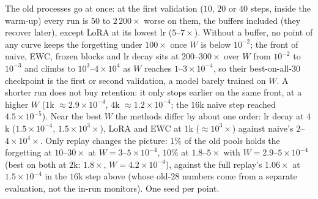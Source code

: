 \documentclass[11pt]{article}
\begin{document}
The old processes go at once: at the first validation ($10$, $20$ or $40$ steps, inside the warm-up) every run is $50$ to
$2\,200\times$ worse on them, the buffers included (they recover later), except LoRA at its lowest lr ($5$--$7\times$). Without a buffer, no point
of any curve keeps the forgetting under $100\times$ once $W$ is below $10^{-2}$; the front of naive, EWC, frozen blocks
and lr decay sits at $200$--$300\times$ over $W$ from $10^{-2}$ to $10^{-3}$ and climbs to $10^{3}$--$4\times10^{4}$ as
$W$ reaches $1$--$3\times10^{-4}$, so their best-on-all-$30$ checkpoint is the first or second validation, a model barely
trained on $W$. A shorter run does not buy retention: it only stops earlier on the same front, at a higher $W$ ($1$k
$\approx2.9\times10^{-4}$, $4$k $\approx1.2\times10^{-4}$; the $16$k naive step reached $4.5\times10^{-5}$). Near the best
$W$ the methods differ by about one order: lr decay at $4$k ($1.5\times10^{-4}$, $1.5\times10^{3}\times$), LoRA and EWC at
$1$k ($\approx10^{3}\times$) against naive's $2$--$4\times10^{4}\times$. Only replay changes the picture: $1\%$ of the old
pools holds the forgetting at $10$--$30\times$ at $W=3$--$5\times10^{-4}$, $10\%$ at $1.8$--$5\times$ with $W=2.9$--$5\times10^{-4}$ (best on both at $2$k: $1.8\times$, $W=4.2\times10^{-4}$),
against the full replay's $1.06\times$ at $1.5\times10^{-4}$ in the $16$k step above (whose old-$28$ numbers come from a
separate evaluation, not the in-run monitors). One seed per point.
\end{document}
